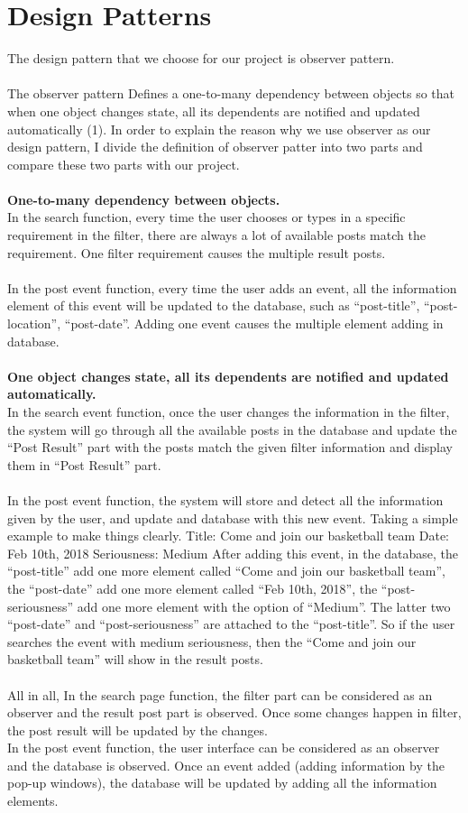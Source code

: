 \documentclass[a4paper]{article}
\begin{document}
\section{Design Patterns}
The design pattern that we choose for our project is observer pattern.\\
\\
The observer pattern Defines a one-to-many dependency between objects so that when one object changes state, all its dependents are notified and updated automatically (1). In order to explain the reason why we use observer as our design pattern, I divide the definition of observer patter into two parts and compare these two parts with our project.\\
\\
\textbf{One-to-many dependency between objects.}\\
In the search function, every time the user chooses or types in a specific requirement in the filter, there are always a lot of available posts match the requirement. One filter requirement causes the multiple result posts.\\
\\
In the post event function, every time the user adds an event, all the information element of this event will be updated to the database, such as “post-title”, “post-location”, “post-date”. Adding one event causes the multiple element adding in database.\\
\\
\textbf{One object changes state, all its dependents are notified and updated automatically.}\\
In the search event function, once the user changes the information in the filter, the system will go through all the available posts in the database and update the “Post Result” part with the posts match the given filter information and display them in “Post Result” part.\\ 
\\
In the post event function, the system will store and detect all the information given by the user, and update and database with this new event. Taking a simple example to make things clearly.
Title: Come and join our basketball team
Date: Feb 10th, 2018
Seriousness: Medium
After adding this event, in the database, the “post-title” add one more element called “Come and join our basketball team”, the “post-date” add one more element called “Feb 10th, 2018”, the “post-seriousness” add one more element with the option of “Medium”. The latter two “post-date” and “post-seriousness” are attached to the “post-title”. So if the user searches the event with medium seriousness, then the “Come and join our basketball team” will show in the result posts.\\
\\
All in all, 
In the search page function, the filter part can be considered as an observer and the result post part is observed. Once some changes happen in filter, the post result will be updated by the changes.\\
In the post event function, the user interface can be considered as an observer and the database is observed. Once an event added (adding information by the pop-up windows), the database will be updated by adding all the information elements.
\end{document}
